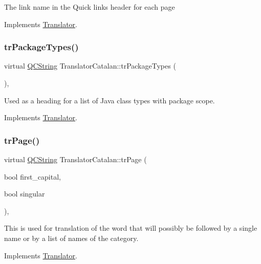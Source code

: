 The link name in the Quick links header for each page 

Implements \mbox{\hyperlink{class_translator}{Translator}}.

\mbox{\label{class_translator_catalan_a0112163a8859d3c566c68112bb1a5a18}} 
\subsubsection{\texorpdfstring{trPackageTypes()}{trPackageTypes()}}
{\footnotesize\ttfamily virtual \mbox{\hyperlink{class_q_c_string}{Q\+C\+String}} Translator\+Catalan\+::tr\+Package\+Types (\begin{DoxyParamCaption}{ }\end{DoxyParamCaption})\hspace{0.3cm}{\ttfamily [inline]}, {\ttfamily [virtual]}}

Used as a heading for a list of Java class types with package scope. 

Implements \mbox{\hyperlink{class_translator}{Translator}}.

\mbox{\label{class_translator_catalan_a304adf768f9a1bbac9dcea677aa0a210}} 
\subsubsection{\texorpdfstring{trPage()}{trPage()}}
{\footnotesize\ttfamily virtual \mbox{\hyperlink{class_q_c_string}{Q\+C\+String}} Translator\+Catalan\+::tr\+Page (\begin{DoxyParamCaption}\item[{bool}]{first\+\_\+capital,  }\item[{bool}]{singular }\end{DoxyParamCaption})\hspace{0.3cm}{\ttfamily [inline]}, {\ttfamily [virtual]}}

This is used for translation of the word that will possibly be followed by a single name or by a list of names of the category. 

Implements \mbox{\hyperlink{class_translator}{Translator}}.

